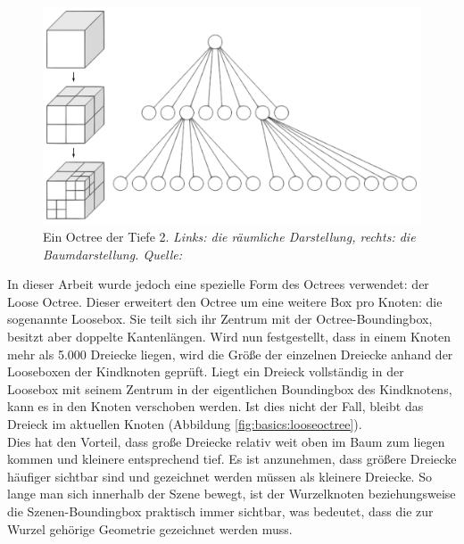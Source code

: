 \begin{figure}
 \centering
  \includegraphics[scale=0.5]{images/octree.pdf}
  \caption{Ein Octree der Tiefe 2. \textit{Links: die räumliche Darstellung, rechts: die Baumdarstellung. Quelle: \cite{wikioctree}}}
 \label{fig:basics:octree}
\end{figure}
In dieser Arbeit wurde jedoch eine spezielle Form des Octrees verwendet: der Loose Octree. Dieser erweitert den Octree um eine weitere Box pro Knoten: die sogenannte Loosebox. Sie teilt sich ihr Zentrum mit der Octree-Boundingbox, besitzt aber doppelte Kantenlängen. Wird nun festgestellt, dass in einem Knoten mehr als 5.000 Dreiecke liegen, wird die Größe der einzelnen Dreiecke anhand der Looseboxen der Kindknoten geprüft. Liegt ein Dreieck vollständig in der Loosebox mit seinem Zentrum in der eigentlichen Boundingbox des Kindknotens, kann es in den Knoten verschoben werden. Ist dies nicht der Fall, bleibt das Dreieck im aktuellen Knoten (Abbildung \ref{fig:basics:looseoctree}).\\
Dies hat den Vorteil, dass große Dreiecke relativ weit oben im Baum zum liegen kommen und kleinere entsprechend tief. Es ist anzunehmen, dass größere Dreiecke häufiger sichtbar sind und gezeichnet werden müssen als kleinere Dreiecke. So lange man sich innerhalb der Szene bewegt, ist der Wurzelknoten beziehungsweise die Szenen-Boundingbox praktisch immer sichtbar, was bedeutet, dass die zur Wurzel gehörige Geometrie gezeichnet werden muss.
